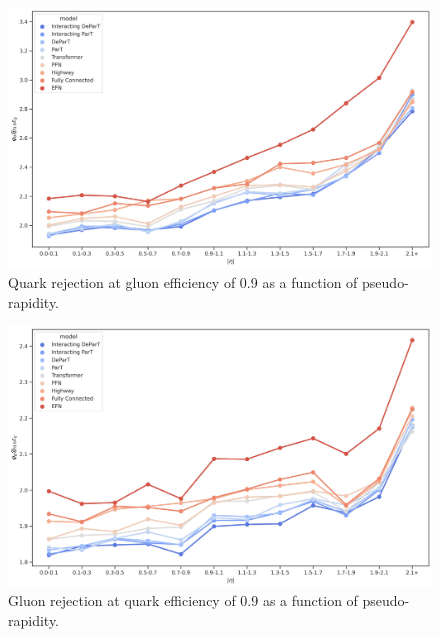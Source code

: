 \begin{figure}[htb]
    \centering
    \includegraphics[width=1\linewidth]{src/plots/results/eta_dep/quark_rej_at_gluon_eff_0.9.jpg}
    \caption{Quark rejection at gluon efficiency of 0.9 as a function of pseudo-rapidity.}
    \label{fig:quark_rej_at_gluon_eff_0.9_eta}
\end{figure}

\begin{figure}[htb]
    \centering
    \includegraphics[width=1\linewidth]{src/plots/results/eta_dep/gluon_rej_at_quark_eff_0.9.jpg}
    \caption{Gluon rejection at quark efficiency of 0.9 as a function of pseudo-rapidity.}
    \label{fig:gluon_rej_at_quark_eff_0.9_eta}
\end{figure}

